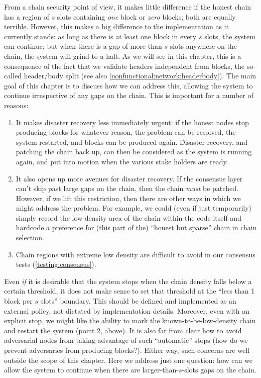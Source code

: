 From a chain security point of view, it makes little difference if the honest
chain has a region of $s$ slots containing \emph{one} block or \emph{zero}
blocks; both are equally terrible. However, this makes a big
difference to the implementation as it currently stands: as long as there is at
least one block in every $s$ slots, the system can continue; but when there is a
gap of more than $s$ slots anywhere on the chain, the system will grind to a
halt. As we will see in this chapter, this is a consequence of the fact that we
validate headers independent from blocks, the so-called header/body split
(see also \cref{nonfunctional:network:headerbody}). The main goal of this
chapter is to discuss how we can address this, allowing the system to continue
irrespective of any gaps on the chain. This is important for a number of
reasons:

\begin{enumerate}
\item It makes disaster recovery less immediately urgent: if the honest nodes
stop producing blocks for whatever reason, the problem can be resolved, the
system restarted, and blocks can be produced again. Disaster recovery,
and patching the chain back up, can then be considered as the system is running
again, and put into motion when the various stake holders are ready.
\item It also opens up more avenues for disaster recovery. If the consensus
layer can't skip past large gaps on the chain, then the chain \emph{must} be
patched. However, if we lift this restriction, then there are other ways in
which we might address the problem. For example, we could (even if just
temporarily) simply record the low-density area of the chain within the code
itself and hardcode a preference for (this part of the) ``honest but sparse''
chain in chain selection.
\item Chain regions with extreme low density are difficult to avoid
in our consensus tests (\cref{testing:consensus}).
\end{enumerate}

Even \emph{if} it is desirable that the system stops when the chain density
falls below a certain threshold, it does not make sense to set that threshold at
the ``less than 1 block per $s$ slots'' boundary. This should be defined and
implemented as an external policy, not dictated by implementation details.
Moreover, even with an explicit stop, we might like the ability to mark the
known-to-be-low-density chain and restart the system (point 2, above). It is
also far from clear how to avoid adversarial nodes from taking advantage of such
``automatic'' stops (how do we prevent adversaries from producing blocks?).
Either way, such concerns are well outside the scope of this chapter. Here we
address just one question: how can we allow the system to continue when there
are larger-than-$s$-slots gaps on the chain.

